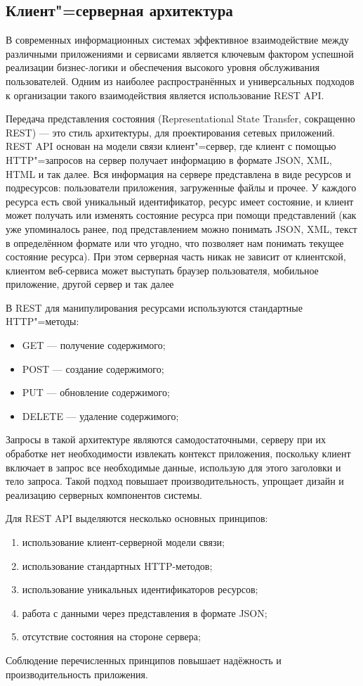\subsection{Клиент"=серверная архитектура}

В современных информационных системах эффективное взаимодействие между различными приложениями и сервисами является ключевым фактором успешной реализации бизнес-логики и обеспечения высокого уровня обслуживания пользователей. Одним из наиболее распространённых и универсальных подходов к организации такого взаимодействия является использование REST API.

Передача представления состояния (Representational State Transfer, сокращенно REST) --- это стиль архитектуры, для проектирования сетевых приложений. REST API основан на модели связи клиент"=сервер, где клиент с помощью HTTP"=запросов на сервер получает информацию в формате JSON, XML, HTML и так далее. Вся информация на сервере представлена в виде ресурсов и подресурсов: пользователи приложения, загруженные файлы и прочее. У каждого ресурса есть свой уникальный идентификатор, ресурс имеет состояние, и клиент может получать или изменять состояние ресурса при помощи представлений (как уже упоминалось ранее, под представлением можно понимать JSON, XML, текст в определённом формате или что угодно, что позволяет нам понимать текущее состояние ресурса). При этом серверная часть никак не зависит от клиентской, клиентом веб-сервиса может выступать браузер пользователя, мобильное приложение, другой сервер и так далее

В REST для манипулирования ресурсами используются стандартные HTTP"=методы:
\begin{itemize}
	\item{GET --- получение содержимого;}
	\item{POST --- создание содержимого;}
	\item{PUT --- обновление содержимого;}
	\item{DELETE --- удаление содержимого;}
\end{itemize}

Запросы в такой архитектуре являются самодостаточными, серверу при их обработке нет необходимости извлекать контекст приложения, поскольку клиент включает в запрос все необходимые данные, использую для этого заголовки и тело запроса. Такой подход повышает производительность, упрощает дизайн и реализацию серверных компонентов системы.

Для REST API выделяются несколько основных принципов:
\begin{enumerate}
	\item{использование клиент-серверной модели связи;}
	\item{использование стандартных HTTP-методов;}
	\item{использование уникальных идентификаторов ресурсов;}
	\item{работа с данными через представления в формате JSON;}
	\item{отсутствие состояния на стороне сервера;}
\end{enumerate}

Соблюдение перечисленных принципов повышает надёжность и производительность приложения.
